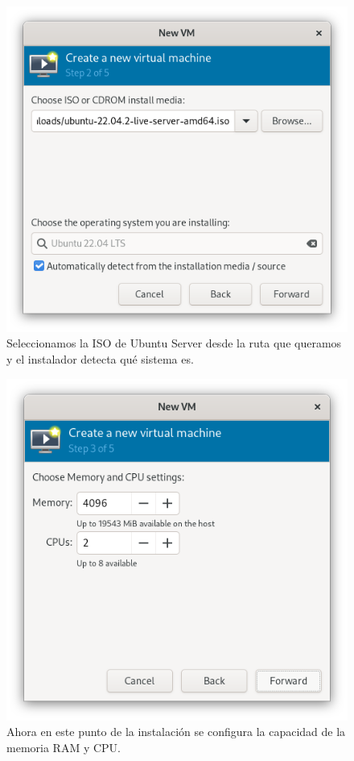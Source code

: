 \begin{figure}[H]
	\centering
	\includegraphics[scale=0.40]{01}
	\caption{Seleccionamos la ISO de Ubuntu Server desde la ruta que queramos y el instalador detecta qué sistema es.}
\end{figure}

\begin{figure}[H]
	\centering
	\includegraphics[scale=0.40]{02}
	\caption{Ahora en este punto de la instalación se configura la capacidad de la memoria RAM y CPU.}
\end{figure}

